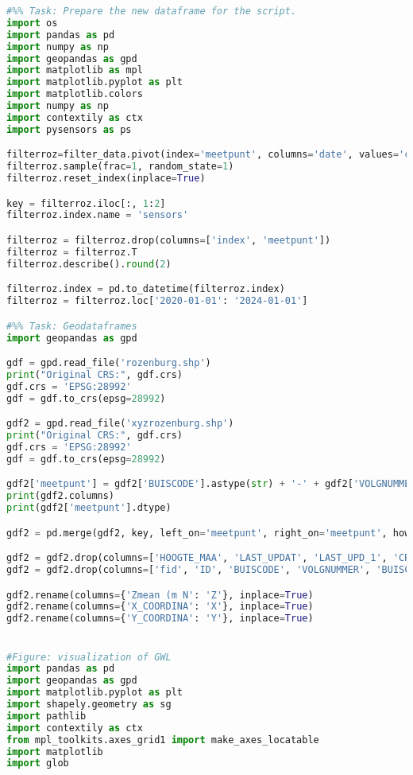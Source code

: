 \begin{lstlisting}[language=Python]
#%% Task: Prepare the new dataframe for the script. 
import os
import pandas as pd 
import numpy as np
import geopandas as gpd
import matplotlib as mpl 
import matplotlib.pyplot as plt 
import matplotlib.colors
import numpy as np 
import contextily as ctx
import pysensors as ps 

filterroz=filter_data.pivot(index='meetpunt', columns='date', values='combination').reset_index()
filterroz.sample(frac=1, random_state=1)
filterroz.reset_index(inplace=True)

key = filterroz.iloc[:, 1:2]
filterroz.index.name = 'sensors'

filterroz = filterroz.drop(columns=['index', 'meetpunt'])
filterroz = filterroz.T
filterroz.describe().round(2)

filterroz.index = pd.to_datetime(filterroz.index)
filterroz = filterroz.loc['2020-01-01': '2024-01-01']

#%% Task: Geodataframes 
import geopandas as gpd

gdf = gpd.read_file('rozenburg.shp')
print("Original CRS:", gdf.crs)
gdf.crs = 'EPSG:28992'
gdf = gdf.to_crs(epsg=28992)

gdf2 = gpd.read_file('xyzrozenburg.shp')
print("Original CRS:", gdf.crs)
gdf.crs = 'EPSG:28992'
gdf = gdf.to_crs(epsg=28992)

gdf2['meetpunt'] = gdf2['BUISCODE'].astype(str) + '-' + gdf2['VOLGNUMMER'].astype(str)
print(gdf2.columns)
print(gdf2['meetpunt'].dtype)

gdf2 = pd.merge(gdf2, key, left_on='meetpunt', right_on='meetpunt', how='left').to_crs(epsg=28992)

gdf2 = gdf2.drop(columns=['HOOGTE_MAA', 'LAST_UPDAT', 'LAST_UPD_1', 'CREATED_BY', 'CREATION_D', 'MAT_CODE'])
gdf2 = gdf2.drop(columns=['fid', 'ID', 'BUISCODE', 'VOLGNUMMER', 'BUISCODE_P', 'INW_DIAMET', 'HOOGTE_MEE', 'NUL_METING', 'BOVENKANT_', 'LENGTE_BUI', 'HOOGTE_BOV', 'TOEL_AFWIJ', 'BTP_CODE', 'MEETMERK', 'PLAATSBEPA', 'DATUM_STAR', 'DATUM_EIND', 'DATUM_VERV', 'IND_PLAATS'])

gdf2.rename(columns={'Zmean (m N': 'Z'}, inplace=True)
gdf2.rename(columns={'X_COORDINA': 'X'}, inplace=True)
gdf2.rename(columns={'Y_COORDINA': 'Y'}, inplace=True)


#Figure: visualization of GWL
import pandas as pd
import geopandas as gpd
import matplotlib.pyplot as plt
import shapely.geometry as sg
import pathlib
import contextily as ctx
from mpl_toolkits.axes_grid1 import make_axes_locatable
import matplotlib
import glob
    

\end{lstlisting}
